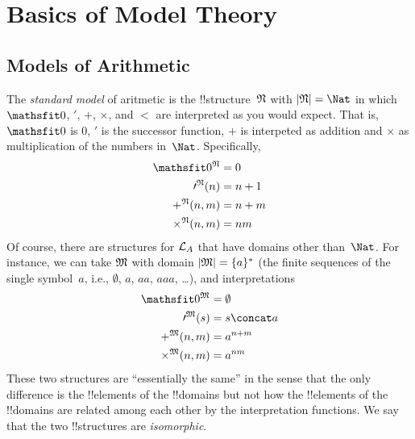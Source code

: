 \documentclass[a4paper]{memoir}
\begin{document}



\cleardoublepage
{\let\newpage\relax
\let\clearpage\relax

\chapter{Basics of Model Theory}}


\section{Models of Arithmetic}

The \emph{standard model} of aritmetic is the
!!{structure}~$\mathfrak N$ with $\Domain{N} = \Nat$ in which
$\Obj{0}$, $\prime$, $+$, $\times$, and $<$ are interpreted as you
would expect. That is, $\Obj{0}$ is $0$, $\prime$ is the successor
function, $+$ is interpeted as addition and $\times$ as multiplication
of the numbers in~$\Nat$. Specifically,
\begin{align*}
  \Assign{\Obj{0}}{N} & = 0\\
  \Assign{\prime}{N}(n) & = n + 1\\
  \Assign{+}{N}(n, m) & = n + m\\
  \Assign{\times}{N}(n, m) & = nm
\end{align*}
Of course, there are structures for $\mathcal L_A$ that have domains
other than~$\Nat$. For instance, we can take $\mathfrak M$ with domain
$\left| \mathfrak M \right| = \{a\}^*$ (the finite sequences of the single
symbol~$a$, i.e., $\emptyset$, $a$, $aa$, $aaa$, \dots), and
interpretations
\begin{align*}
  \Assign{\Obj{0}}{M} & = \emptyset\\
  \Assign{\prime}{M}(s) & = s \concat a\\
  \Assign{+}{M}(n, m) & = a^{n + m}\\
  \Assign{\times}{M}(n, m) & = a^{nm}
\end{align*}
These two structures are ``essentially the same'' in the sense that
the only difference is the !!{element}s of the !!{domain}s but not how
the !!{element}s of the !!{domain}s are related among each other by
the interpretation functions. We say that the two !!{structure}s are
\emph{isomorphic}.
\end{document}
